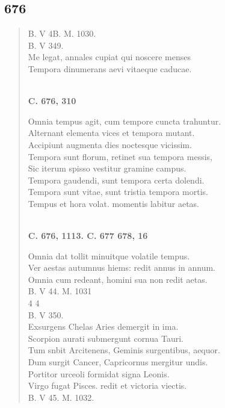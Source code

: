 \documentclass[11pt, a4paper]{report}
\begin{document}
            \subsection*{676}
      \begin{verse}
      B. V 4B. M. 1030. \\ B. V 349. \\ Me legat, annales cupiat qui noscere menses \\ Tempora dinumerans aevi vitaeque caducae. \\ 
        ﻿\pagebreak 
    \begin{center} \textbf{C. 676, 310} \end{center}Omnia tempus agit, cum tempore cuncta trahuntur. \\ Alternant elementa vices et tempora mutant. \\ Accipiunt augmenta dies noctesque vicissim. \\ Tempora sunt florum, retinet sua tempora messis, \\ Sic iterum spisso vestitur gramine campus. \\ Tempora gaudendi, sunt tempora certa dolendi. \\ Tempora sunt vitae, sunt tristia tempora mortis. \\ Tempus et hora volat. momentis labitur aetas. \\ 
        ﻿\pagebreak 
    \begin{center} \textbf{C. 676, 1113. C. 677 678, 16} \end{center} \marginpar{[153]} Omnia dat tollit minuitque volatile tempus. \\ Ver aestas autumnus hiems: redit annus in annum. \\ Omnia cum redeant, homini sua non redit aetas. \\ B. V 44. M. 1031 \\ 4 4 \\ B. V 350. \\ Exsurgens Chelas Aries demergit in ima. \\ Scorpion aurati submergunt cornua Tauri. \\ Tum snbit Arcitenens, Geminis surgentibus, aequor. \\ Dum surgit Cancer, Capricornus mergitur undis. \\ Portitor urceoli formidat signa Leonis. \\ Virgo fugat Pisces. redit et victoria viectis. \\ B. V 45. M. 1032. \\ 
      \end{verse}
  
\end{document}
